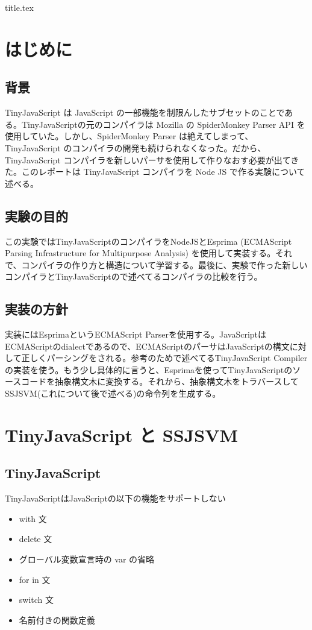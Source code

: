 \documentclass[12pt]{article}
\begin{document}
 {title.tex}

\tableofcontents

\newpage
{}

\section{はじめに}
\subsection{背景}
TinyJavaScript は JavaScript の一部機能を制限んしたサブセットのことである\cite{jscompiler}。TinyJavaScriptの元のコンパイラは Mozilla の SpiderMonkey Parser API \cite{spidermonkey}を使用していた。しかし、SpiderMonkey Parser は絶えてしまって、TinyJavaScript のコンパイラの開発も続けられなくなった。だから、TinyJavaScript コンパイラを新しいパーサを使用して作りなおす必要が出てきた。このレポートは TinyJavaScript コンパイラを Node JS で作る実験について述べる。

\subsection{実験の目的}
この実験ではTinyJavaScriptのコンパイラをNodeJSとEsprima (ECMAScript Parsing Infrastructure for Multipurpose Analysis) \cite{esprima}を使用して実装する。それで、コンパイラの作り方と構造について学習する。最後に、実験で作った新しいコンパイラとTinyJavaScriptの\cite{jscompiler}で述べてるコンパイラの比較を行う。

\subsection{実装の方針}
実装にはEsprimaというECMAScript\cite{ecmascript} Parserを使用する。JavaScriptはECMAScriptのdialectであるので、ECMAScriptのパーサはJavaScriptの構文に対して正しくパーシングをされる。参考のため\cite{jscompiler}で述べてるTinyJavaScript Compilerの実装を使う。もう少し具体的に言うと、Esprimaを使ってTinyJavaScriptのソースコードを抽象構文木に変換する。それから、抽象構文木をトラバースしてSSJSVM(これについて後で述べる)の命令列を生成する。

\section{TinyJavaScript と SSJSVM}
\subsection{TinyJavaScript}
TinyJavaScriptはJavaScriptの以下の機能をサポートしない \cite{jscompiler}
\begin{itemize}
\item with 文
\item delete 文
\item グローバル変数宣言時の var の省略
\item for in 文
\item switch 文
\item 名前付きの関数定義
\end{itemize}
\end{document}
